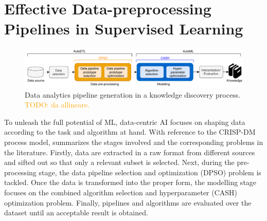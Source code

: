 
\chapter{Effective Data-preprocessing Pipelines in Supervised Learning}
\label{data-centric-chap:supervised}

\begin{figure}[t]
    \centering
    \includegraphics[width=1.0\textwidth]{chapters/data-centric/supervised/img/data-analytics-pipeline.pdf}
    \caption{Data analytics pipeline generation in a knowledge discovery process. \textcolor{orange}{TODO: da allineare.}}
    \label{effective-fig:data-analytics-pipeline}
\end{figure}

To unleash the full potential of ML, data-centric AI focuses on shaping data according to the task and algorithm at hand.
With reference to the CRISP-DM process model,   summarizes the stages involved and the corresponding problems in the literature.
Firstly, data are extracted in a raw format from different sources and sifted out so that only a relevant subset is selected.
Next, during the pre-processing stage, the data pipeline selection and optimization (DPSO) \cite{Quemy19DOLAP} problem is tackled.
Once the data is transformed into the proper form, the modelling stage focuses on the combined algorithm selection and hyperparameter (CASH) optimization problem.
Finally, pipelines and algorithms
are evaluated over the dataset until an acceptable result is obtained.



